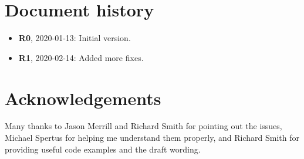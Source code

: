 \pagebreak
\section*{Document history}

\begin{itemize}
\item \textbf{R0}, 2020-01-13: Initial version.
\item \textbf{R1}, 2020-02-14: Added more fixes.
\end{itemize}

\section*{Acknowledgements}

Many thanks to Jason Merrill and Richard Smith for pointing out the issues, Michael Spertus for helping me understand them properly, and Richard Smith for providing useful code examples and the draft wording.

\renewcommand{\bibname}{References}



